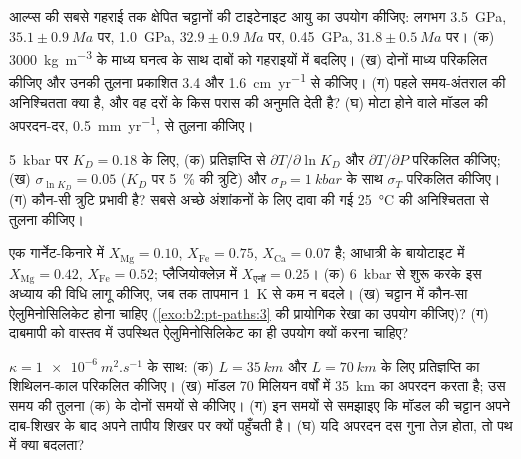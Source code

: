 \begin{exercise}[$\star\star$]\label{exo:b2:pt-paths:8}
आल्प्स की सबसे गहराई तक क्षेपित चट्टानों की टाइटेनाइट आयु का उपयोग कीजिए: लगभग \qty{3.5}{GPa},
$35.1 \pm \qty{0.9}{Ma}$ पर, \qty{1.0}{GPa}, $32.9 \pm \qty{0.9}{Ma}$ पर, \qty{0.45}{GPa},
$31.8 \pm \qty{0.5}{Ma}$ पर। (क) \qty{3000}{kg.m^{-3}} के माध्य घनत्व के साथ दाबों को
गहराइयों में बदलिए। (ख) दोनों माध्य  परिकलित कीजिए और उनकी तुलना
प्रकाशित 3.4 और \qty{1.6}{cm.yr^{-1}} से कीजिए। (ग) पहले समय-अंतराल की
अनिश्चितता क्या है, और वह दरों के किस परास की अनुमति देती है? (घ) मोटा होने वाले मॉडल की
अपरदन-दर, \qty{0.5}{mm.yr^{-1}}, से तुलना कीजिए।
\end{exercise}

\begin{exercise}[$\star\star$]\label{exo:b2:pt-paths:9}
\qty{5}{kbar} पर $K_D = 0.18$ के लिए, (क) प्रतिज्ञप्ति से $\partial T/\partial\ln K_D$ और
$\partial T/\partial P$ परिकलित कीजिए; (ख) $\sigma_{\ln K_D} = 0.05$ ($K_D$ पर
\qty{5}{\percent} की त्रुटि) और $\sigma_P = \qty{1}{kbar}$ के साथ $\sigma_T$ परिकलित कीजिए।
(ग) कौन-सी त्रुटि प्रभावी है? सबसे अच्छे अंशांकनों के लिए दावा की गई \qty{25}{\celsius} की अनिश्चितता से
तुलना कीजिए।
\end{exercise}

\begin{exercise}[$\star\star\star$]\label{exo:b2:pt-paths:10}
एक गार्नेट-किनारे में $X_{\text{Mg}} = 0.10$, $X_{\text{Fe}} = 0.75$, $X_{\text{Ca}} = 0.07$ है;
आधात्री के बायोटाइट में $X_{\text{Mg}} = 0.42$, $X_{\text{Fe}} = 0.52$; प्लैजियोक्लेज़ में
$X_{\text{एनॉ}} = 0.25$। (क) \qty{6}{kbar} से शुरू करके इस अध्याय की विधि लागू कीजिए,
जब तक तापमान \qty{1}{K} से कम न बदले। (ख) चट्टान में कौन-सा ऐलुमिनोसिलिकेट
होना चाहिए (\cref{exo:b2:pt-paths:3} की प्रायोगिक रेखा का उपयोग कीजिए)? (ग) दाबमापी को
वास्तव में उपस्थित ऐलुमिनोसिलिकेट का ही उपयोग क्यों करना चाहिए?
\end{exercise}

\begin{exercise}[$\star\star\star$]\label{exo:b2:pt-paths:11}
$\kappa = \qty{1e-6}{m^2.s^{-1}}$ के साथ: (क) $L = \qty{35}{km}$ और
$L = \qty{70}{km}$ के लिए प्रतिज्ञप्ति का शिथिलन-काल परिकलित कीजिए। (ख) मॉडल
70 मिलियन वर्षों में \qty{35}{km} का अपरदन करता है; उस समय की तुलना (क) के दोनों समयों से कीजिए। (ग)
इन समयों से समझाइए कि मॉडल की चट्टान अपने दाब-शिखर के बाद अपने तापीय शिखर पर
क्यों पहुँचती है। (घ) यदि अपरदन दस गुना तेज़ होता, तो पथ में क्या बदलता?
\end{exercise}

